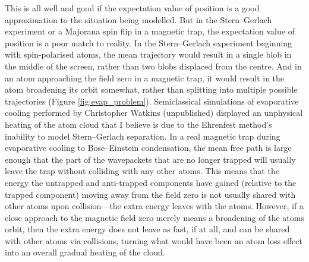 This is all well and good if the expectation value of position is a good approximation to the situation being modelled. But in the Stern--Gerlach experiment or a Majorana spin flip in a magnetic trap, the expectation value of position is a poor match to reality. In the Stern--Gerlach experiment beginning with spin-polarised atoms, the mean trajectory would result in a single blob in the middle of the screen, rather than two blobs displaced from the centre. And in an atom approaching the field zero in a magnetic trap, it would result in the atom broadening its orbit somewhat, rather than splitting into multiple possible trajectories (Figure \ref{fig:evap_problem}). Semiclassical simulations of evaporative cooling performed by Christopher Watkins (unpublished) displayed an unphysical heating of the atom cloud that I believe is due to the Ehrenfest method's inability to model Stern--Gerlach separation. In a real magnetic trap during evaporative cooling to Bose--Einstein condensation, the mean free path is large enough that the part of the wavepackets that are no longer trapped will usually leave the trap without colliding with any other atoms. This means that the energy the untrapped and anti-trapped components have gained (relative to the trapped component) moving away from the field zero is not usually shared with other atoms upon collision---the extra energy leaves with the atoms. However, if a close approach to the magnetic field zero merely means a broadening of the atoms orbit, then the extra energy does not leave as fast, if at all, and can be shared with other atoms via collisions, turning what would have been an atom loss effect into an overall gradual heating of the cloud. 

